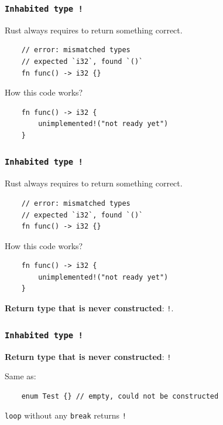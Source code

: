 \documentclass[aspectratio=1610,t]{beamer}
\begin{document}

\begin{frame}[fragile]
\frametitle{\texttt{Inhabited type \texttt{!}}}
Rust always requires to return something correct.

\begin{verbatim}
    // error: mismatched types
    // expected `i32`, found `()`
    fn func() -> i32 {}
\end{verbatim}

How this code works?

\begin{verbatim}
    fn func() -> i32 {
        unimplemented!("not ready yet")
    }
\end{verbatim}
\end{frame}


\begin{frame}[fragile]
\frametitle{\texttt{Inhabited type \texttt{!}}}
Rust always requires to return something correct.

\begin{verbatim}
    // error: mismatched types
    // expected `i32`, found `()`
    fn func() -> i32 {}
\end{verbatim}

How this code works?

\begin{verbatim}
    fn func() -> i32 {
        unimplemented!("not ready yet")
    }
\end{verbatim}

\textbf{Return type that is never constructed}: \texttt{!}.
\end{frame}


\begin{frame}[fragile]
\frametitle{\texttt{Inhabited type \texttt{!}}}
\textbf{Return type that is never constructed}: \texttt{!}

Same as:

\begin{verbatim}
    enum Test {} // empty, could not be constructed
\end{verbatim}

\texttt{loop} without any \texttt{break} returns \texttt{!}
\end{frame}
\end{document}
